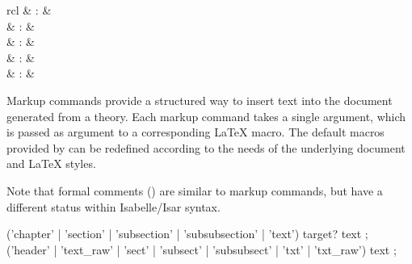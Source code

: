 \begin{isabellebody}
\begin{isamarkuptext}
\begin{matharray}{rcl}
    \hypertarget{command.sect}{\hyperlink{command.sect}{\mbox{}}} & : &  \\
    \hypertarget{command.subsect}{\hyperlink{command.subsect}{\mbox{}}} & : &  \\
    \hypertarget{command.subsubsect}{\hyperlink{command.subsubsect}{\mbox{}}} & : &  \\
    \hypertarget{command.txt}{\hyperlink{command.txt}{\mbox{}}} & : &  \\
    \hypertarget{command.txt-raw}{\hyperlink{command.txt-raw}{\mbox{}}} & : &  \\
  \end{matharray}

  Markup commands provide a structured way to insert text into the
  document generated from a theory.  Each markup command takes a
  single \hyperlink{syntax.text}{\mbox{}} argument, which is passed as argument to a
  corresponding {\LaTeX} macro.  The default macros provided by
  \hyperlink{file.~~/lib/texinputs/isabelle.sty}{\mbox{}} can be redefined according
  to the needs of the underlying document and {\LaTeX} styles.

  Note that formal comments () are similar to
  markup commands, but have a different status within Isabelle/Isar
  syntax.

  \begin{rail}
    ('chapter' | 'section' | 'subsection' | 'subsubsection' | 'text') target? text
    ;
    ('header' | 'text_raw' | 'sect' | 'subsect' | 'subsubsect' | 'txt' | 'txt_raw') text
    ;
  \end{rail}

  \begin{description}


\end{description}
\end{isamarkuptext}
\end{isabellebody}
